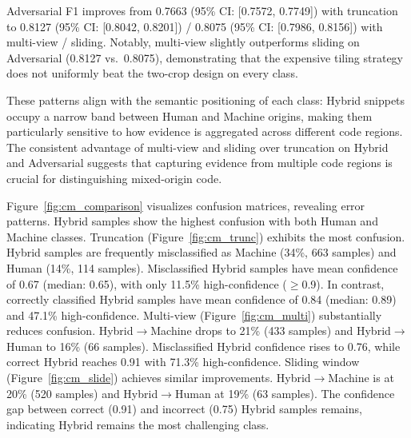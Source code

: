 \documentclass[conference]{IEEEtran}
\begin{document}
Adversarial F1 improves from 0.7663 (95\% CI: [0.7572, 0.7749]) with truncation to 0.8127 (95\% CI: [0.8042, 0.8201]) / 0.8075 (95\% CI: [0.7986, 0.8156]) with multi-view / sliding. Notably, multi-view slightly outperforms sliding on Adversarial (0.8127 vs.\ 0.8075), demonstrating that the expensive tiling strategy does not uniformly beat the two-crop design on every class.

These patterns align with the semantic positioning of each class: Hybrid snippets occupy a narrow band between Human and Machine origins, making them particularly sensitive to how evidence is aggregated across different code regions. The consistent advantage of multi-view and sliding over truncation on Hybrid and Adversarial suggests that capturing evidence from multiple code regions is crucial for distinguishing mixed-origin code.

\begin{table}[htbp]
  \centering
  \caption{Per-class F1 scores on the held-out test split.}
  \label{tab:perclass}
\end{table}

Figure~\ref{fig:cm_comparison} visualizes confusion matrices, revealing error patterns. Hybrid samples show the highest confusion with both Human and Machine classes. Truncation (Figure~\ref{fig:cm_trunc}) exhibits the most confusion. Hybrid samples are frequently misclassified as Machine (34\%, 663 samples) and Human (14\%, 114 samples). Misclassified Hybrid samples have mean confidence of 0.67 (median: 0.65), with only 11.5\% high-confidence ($\geq$0.9). In contrast, correctly classified Hybrid samples have mean confidence of 0.84 (median: 0.89) and 47.1\% high-confidence. Multi-view (Figure~\ref{fig:cm_multi}) substantially reduces confusion. Hybrid$\rightarrow$Machine drops to 21\% (433 samples) and Hybrid$\rightarrow$Human to 16\% (66 samples). Misclassified Hybrid confidence rises to 0.76, while correct Hybrid reaches 0.91 with 71.3\% high-confidence. Sliding window (Figure~\ref{fig:cm_slide}) achieves similar improvements. Hybrid$\rightarrow$Machine is at 20\% (520 samples) and Hybrid$\rightarrow$Human at 19\% (63 samples). The confidence gap between correct (0.91) and incorrect (0.75) Hybrid samples remains, indicating Hybrid remains the most challenging class.
\end{document}
